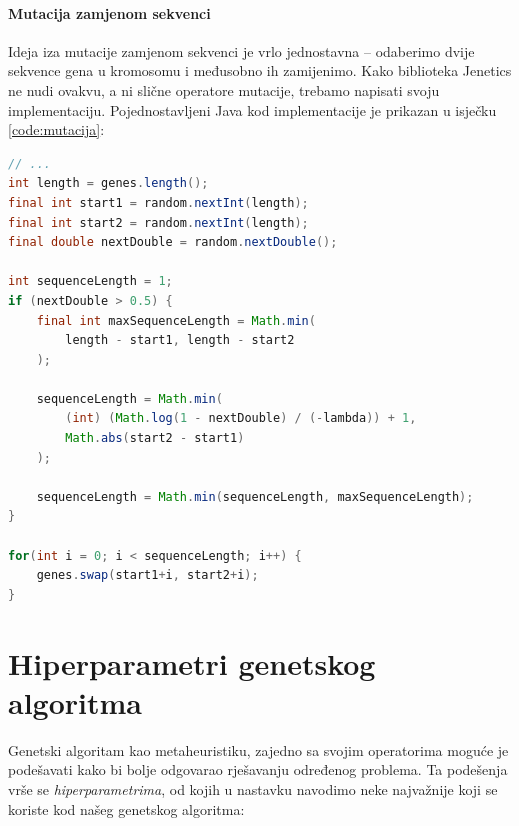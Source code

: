 \documentclass[times, utf8, zavrsni]{fer}
\begin{document}
\paragraph{Mutacija zamjenom sekvenci} Ideja iza mutacije zamjenom sekvenci je vrlo jednostavna -- odaberimo dvije sekvence gena u kromosomu i međusobno ih zamijenimo. Kako biblioteka Jenetics ne nudi ovakvu, a ni slične operatore mutacije, trebamo napisati svoju implementaciju. Pojednostavljeni Java kod implementacije je prikazan u isječku \ref{code:mutacija}:

\begin{lstlisting}[language=java, caption=Mutacija zamjenom sekvenci, label={code:mutacija}, mathescape]
// ...
int length = genes.length();
final int start1 = random.nextInt(length);
final int start2 = random.nextInt(length);
final double nextDouble = random.nextDouble();

int sequenceLength = 1;
if (nextDouble > 0.5) {
    final int maxSequenceLength = Math.min(
        length - start1, length - start2
    );

    sequenceLength = Math.min(
        (int) (Math.log(1 - nextDouble) / (-lambda)) + 1,
        Math.abs(start2 - start1)
    );

    sequenceLength = Math.min(sequenceLength, maxSequenceLength);
}

for(int i = 0; i < sequenceLength; i++) {
    genes.swap(start1+i, start2+i);
}
\end{lstlisting}

\section{Hiperparametri genetskog algoritma}
Genetski algoritam kao metaheuristiku, zajedno sa svojim operatorima moguće je podešavati kako bi bolje odgovarao rješavanju određenog problema. Ta podešenja vrše se \textit{hiperparametrima}, od kojih u nastavku navodimo neke najvažnije koji se koriste kod našeg genetskog algoritma:
\end{document}
